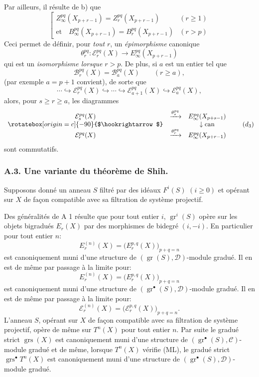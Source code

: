 \documentclass[11pt]{article}
\providecommand{\gr}{\operatorname{gr}}
\providecommand{\gr}{\operatorname{gr}}
\providecommand{\gr}{\operatorname{gr}}
\providecommand{\grs}{\operatorname{grs}}
\providecommand{\can}{\operatorname{can}}
\begin{document}
Par ailleurs, il résulte de b) que
\begin{equation}
\left[
\begin{array}{ll}
Z_\infty^{pq}(X_{p+r-1})=Z_r^{pq}(X_{p+r-1})&(r\ge1)\\[3pt]
\text{et}\quad B_\infty^{pq}(X_{p+r-1})=B_r^{pq}(X_{p+r-1})&(r>p)
\end{array}
\right.
\tag{\(d_2\)}
\end{equation}
Ceci permet de définir, pour \emph{tout} \(r\), un \emph{épimorphisme} canonique
\[
\theta_r^{pq}:\mathcal E_r^{pq}(X)\longrightarrow E_\infty^{pq}(X_{p+r-1})
\]
qui est un \emph{isomorphisme lorsque} \(r>p\). De plus, si \(a\) est un entier tel que
\[
\mathcal B_r^{pq}(X)=\mathcal B_a^{pq}(X)\qquad(r\ge a),
\]
(par exemple \(a=p+1\) convient), de sorte que
\begin{equation}
\cdots\hookrightarrow\mathcal E_r^{pq}(X)\hookrightarrow\cdots\hookrightarrow
\mathcal E_{a+1}^{pq}(X)\hookrightarrow\mathcal E_a^{pq}(X),
\tag{S bis}
\end{equation}
alors, pour \(s\ge r\ge a\), les diagrammes
\begin{equation}
\begin{array}{ccc}
\mathcal E_s^{pq}(X)&\xrightarrow{\theta_s^{pq}}&E_\infty^{pq}(X_{p+s-1})\\
\rotatebox[origin=c]{-90}{$\hookrightarrow$}&&\downarrow\can\\
\mathcal E_r^{pq}(X)&\xrightarrow{\theta_r^{pq}}&E_\infty^{pq}(X_{p+r-1})
\end{array}
\tag{\(d_3\)}
\end{equation}
sont commutatifs.

\subsubsection*{A.3. Une variante du théorème de Shih.}
Supposons donné un anneau \(S\) filtré par des idéaux \(F^i(S)\) \((i\ge0)\) et opérant sur \(X\) de façon compatible avec sa filtration de système projectif.

Des généralités de A 1 résulte que pour tout entier \(i\), \(\gr^i(S)\) opère sur les objets bigradués \(E_r(X)\) par des morphismes de bidegré \((i,-i)\). En particulier pour tout entier \(n\):
\[
E_r^{(n)}(X)=\bigl(E_r^{p,q}(X)\bigr)_{p+q=n}
\]
est canoniquement muni d'une structure de \((\gr(S),\mathcal D)\)-module gradué. Il en est de même par passage à la limite pour:
\[
E^{(n)}_r(X)=\bigl(E_r^{p,q}(X)\bigr)_{p+q=n}
\]
est canoniquement muni d'une structure de \((\gr^\bullet(S),\mathcal D)\)-module gradué. Il en est de même par passage à la limite pour:
\[
\mathcal E_r^{(n)}(X)=\bigl(\mathcal E_r^{p,q}(X)\bigr)_{p+q=n}.
\]
L'anneau \(S\), opérant sur \(X\) de façon compatible avec sa filtration de système projectif, opère de même sur \(T^n(X)\) pour tout entier \(n\). Par suite le gradué strict \(\grs(X)\) est
canoniquement muni d'une structure de \((\gr^\bullet(S),\mathcal C)\)-module gradué et de même, lorsque \(T^n(X)\) vérifie (ML), le gradué strict \(\grs^\bullet T^n(X)\) est canoniquement muni d'une structure de \((\gr^\bullet(S),\mathcal D)\)-module gradué.
\end{document}
